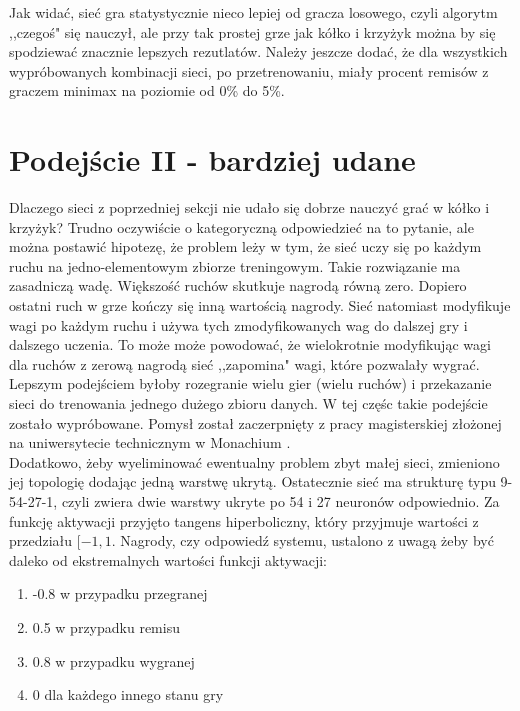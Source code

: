\documentclass[licencjacka]{pracamgr}
\begin{document}
Jak widać, sieć gra statystycznie nieco lepiej od gracza losowego, czyli algorytm ,,czegoś" się nauczył, ale przy tak prostej grze jak kółko i krzyżyk można by się spodziewać znacznie lepszych rezutlatów. Należy jeszcze dodać, że dla wszystkich wypróbowanych kombinacji sieci, po przetrenowaniu, miały procent remisów z graczem minimax na poziomie od 0\% do 5\%.


\section{Podejście II - bardziej udane}

Dlaczego sieci z poprzedniej sekcji nie udało się dobrze nauczyć grać w kółko i krzyżyk? Trudno oczywiście o kategoryczną odpowiedzieć na to pytanie, ale można postawić hipotezę, że problem leży w tym, że sieć uczy się po każdym ruchu na jedno-elementowym zbiorze treningowym. Takie rozwiązanie ma zasadniczą wadę. Większość ruchów skutkuje nagrodą równą zero. Dopiero ostatni ruch w grze kończy się inną wartością nagrody. Sieć natomiast modyfikuje wagi po każdym ruchu i używa tych zmodyfikowanych wag do dalszej gry i dalszego uczenia.  To może może powodować, że wielokrotnie modyfikując wagi dla ruchów z zerową nagrodą sieć ,,zapomina" wagi, które pozwalały wygrać. Lepszym podejściem byłoby rozegranie wielu gier (wielu ruchów) i przekazanie sieci do trenowania jednego dużego zbioru danych. W tej częśc takie podejście zostało wypróbowane. Pomysł został zaczerpnięty z pracy magisterskiej złożonej na uniwersytecie technicznym w Monachium \cite{TUM}.\\

Dodatkowo, żeby wyeliminować ewentualny problem zbyt małej sieci, zmieniono jej topologię dodając jedną warstwę ukrytą. Ostatecznie sieć ma strukturę typu 9-54-27-1, czyli zwiera dwie warstwy ukryte po 54 i 27 neuronów odpowiednio.  Za funkcję aktywacji przyjęto tangens hiperboliczny, który przyjmuje wartości z przedziału $[-1,1$. Nagrody, czy odpowiedź systemu, ustalono z uwagą żeby być daleko od ekstremalnych wartości funkcji aktywacji:

\begin{enumerate}
	\item{-0.8 w przypadku przegranej}
	\item{0.5 w przypadku remisu }
	\item{0.8 w przypadku wygranej}
	\item{0 dla każdego innego stanu gry}
\end{enumerate}
\end{document}
